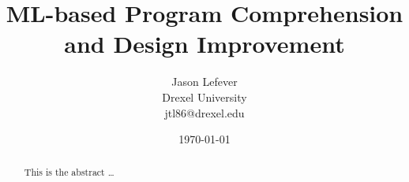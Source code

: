 \documentclass[11pt,letterpaper]{article}
\title{ML-based Program Comprehension and Design Improvement}
\author{Jason Lefever\\Drexel University\\jtl86@drexel.edu}
\date{\today}
\begin{document}
\maketitle
\begin{abstract}
This is the abstract \ldots
\end{abstract}



\printbibliography
\end{document}
